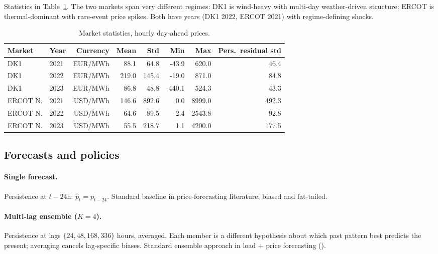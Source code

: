 \documentclass[11pt]{article}
\begin{document}
Statistics in Table~\ref{tab:marketstats}. The two markets span very different regimes: DK1 is wind-heavy with multi-day weather-driven structure; ERCOT is thermal-dominant with rare-event price spikes. Both have years (DK1 2022, ERCOT 2021) with regime-defining shocks.

\begin{table}[t]
\centering\small
\caption{\label{tab:marketstats}Market statistics, hourly day-ahead prices.}
\begin{tabular}{llrrrrrr}
\toprule
Market & Year & Currency & Mean & Std & Min & Max & Pers.\ residual std \\
\midrule
DK1 & 2021 & EUR/MWh & 88.1   & 64.8   & -43.9   & 620.0  & 46.4  \\
DK1 & 2022 & EUR/MWh & 219.0  & 145.4  & -19.0   & 871.0  & 84.8  \\
DK1 & 2023 & EUR/MWh & 86.8   & 48.8   & -440.1  & 524.3  & 43.3  \\
ERCOT N. & 2021 & USD/MWh & 146.6  & 892.6  & 0.0     & 8999.0 & 492.3 \\
ERCOT N. & 2022 & USD/MWh & 64.6   & 89.5   & 2.4     & 2543.8 & 92.8  \\
ERCOT N. & 2023 & USD/MWh & 55.5   & 218.7  & 1.1     & 4200.0 & 177.5 \\
\bottomrule
\end{tabular}
\end{table}

\subsection{Forecasts and policies}

\paragraph{Single forecast.} Persistence at $t-24$h: $\hat{p}_t = p_{t-24}$. Standard baseline in price-forecasting literature; biased and fat-tailed.

\paragraph{Multi-lag ensemble ($K{=}4$).} Persistence at lags $\{24, 48, 168, 336\}$ hours, averaged. Each member is a different hypothesis about which past pattern best predicts the present; averaging cancels lag-specific biases. Standard ensemble approach in load + price forecasting (\citealp{hong2014global, weron2014electricity}).
\end{document}
